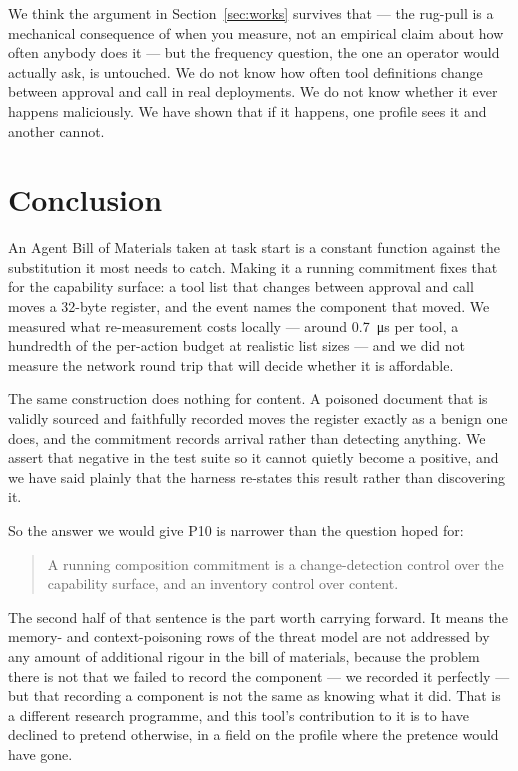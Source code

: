 \documentclass[11pt]{article}
\begin{document}
We think the argument in Section~\ref{sec:works} survives that --- the
rug-pull is a mechanical consequence of when you measure, not an empirical
claim about how often anybody does it --- but the frequency question, the one
an operator would actually ask, is untouched. We do not know how often tool
definitions change between approval and call in real deployments. We do not
know whether it ever happens maliciously. We have shown that if it happens,
one profile sees it and another cannot.

\section{Conclusion}

An Agent Bill of Materials taken at task start is a constant function against
the substitution it most needs to catch. Making it a running commitment fixes
that for the capability surface: a tool list that changes between approval and
call moves a 32-byte register, and the event names the component that moved.
We measured what re-measurement costs locally --- around
\SI{0.7}{\micro\second} per tool, a hundredth of the per-action budget at
realistic list sizes --- and we did not measure the network round trip that
will decide whether it is affordable.

The same construction does nothing for content. A poisoned document that is
validly sourced and faithfully recorded moves the register exactly as a benign
one does, and the commitment records arrival rather than detecting anything.
We assert that negative in the test suite so it cannot quietly become a
positive, and we have said plainly that the harness re-states this result
rather than discovering it.

So the answer we would give P10 is narrower than the question hoped for:

\begin{quote}
A running composition commitment is a change-detection control over the
capability surface, and an inventory control over content.
\end{quote}

The second half of that sentence is the part worth carrying forward. It means
the memory- and context-poisoning rows of the threat model are not addressed
by any amount of additional rigour in the bill of materials, because the
problem there is not that we failed to record the component --- we recorded it
perfectly --- but that recording a component is not the same as knowing what
it did. That is a different research programme, and this tool's contribution
to it is to have declined to pretend otherwise, in a field on the profile
where the pretence would have gone.
\end{document}
